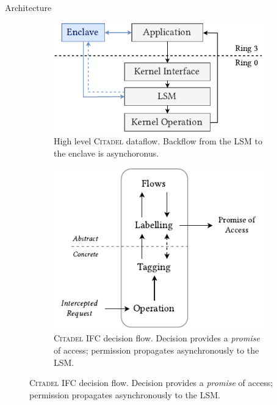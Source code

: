 \documentclass[xcolor=dvipsnames]{beamer}
\begin{document}
\begin{frame}{Architecture}

    \begin{figure}
        \centering
        \begin{subfigure}{.5\textwidth}
          \centering
          \includegraphics[width=.9\linewidth]{../figures/SGX-EnclaveIntegration-SoloActual.pdf}
          \vspace{5mm}
          \caption{High level \textsc{Citadel} dataflow. Backflow from the LSM to the enclave is asynchoronus.}
          \label{fig:sub1}
        \end{subfigure}%
        \begin{subfigure}{.5\textwidth}
          \centering
          \includegraphics[width=\linewidth]{../figures/IFCFlow-2.pdf}
          \vspace{5mm}
          \caption{\textsc{Citadel} IFC decision flow. Decision provides a \textit{promise} of access; permission propagates asynchronously to the LSM.}
          \label{fig:sub2}
        \end{subfigure}
        \label{fig:test}
    \end{figure}

    
\end{frame}
\end{document}
